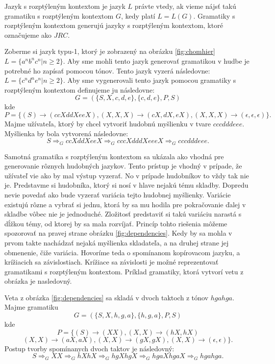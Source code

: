 Jazyk s rozptýleným kontextom je jazyk $L$ právte vtedy, ak vieme nájsť takú gramatiku s rozptýleným kontextom $G$, kedy platí $L = L(G)$. Gramatiky s rozptýleným kontextom generujú jazyky s rozptýleným kontextom, ktoré označujeme ako $JRC$.

\begin{example}
    Zoberme si jazyk typu-1, ktorý je zobrazený na obrázku \ref{fig:chomhier} \\ $L = \{a^n b^n c^n| n \geq 2\}$. Aby sme mohli tento jazyk generovať gramatikou v hudbe je potrebné ho zapísať pomocou tónov. Tento jazyk vyzerá následovne: $L = \{c^n d^n e^n| n \geq 2\}$. Aby sme vygenerovali tento jazyk pomocou gramatiky s rozptýleným kontextom definujeme ju následovne: $$ G = (\{S, X, c, d, e\}, \{c,d,e\}, P, S)$$ kde $$P = \{(S) \rightarrow (ccXddXeeX), (X,X,X) \rightarrow (cX, dX, eX), (X,X,X) \rightarrow (\epsilon, \epsilon, \epsilon)\}.$$
    Majme užívateľa, ktorý by chcel vytvoriť hudobnú myšlienku v tvare $cccdddeee$. Myšlienka by bola vytvorená následovne: $$ S \Rightarrow_G  ccXddXeeX \Rightarrow_G cccXdddXeeeX \Rightarrow_G cccdddeee.$$
\end{example}

Samotná gramatika s rozptýleným kontextom sa ukázala ako vhodná pre generovanie rôznych hudobných jazykov. Tento prístup je vhodný v prípade, že užívateľ vie ako by mal výstup vyzerať. No v prípade hudobníkov to vždy tak nie je. Predstavme si hudobníka, ktorý si nosí v hlave nejakú tému skladby. Dopredu nevie povedať ako bude vyzerať variácia tejto hudobnej myšlienky. Variácie existujú rôzne a vybrať si jednu, ktorá by sa mu hodila pre pokračovanie ďalej v skladbe vôbec nie je jednoduché. Zložitosť predstaviť si takú variáciu narastá s dĺžkou témy, od ktorej by sa mala rozvíjať. Princíp tohto riešenia môžeme spozorovať na pravej strane obrázku \ref{fig:dependencies}. Kedy by sa mohla v prvom takte nachádzať nejaká myšlienka skladateľa, a na druhej strane jej obmenenie, čiže variácia. Hovoríme teda o spomínanom kopírovacom jazyku, a krížiacich sa závislostiach. Krížiace sa závislosti je možné reprezentovať gramatikami s rozptýleným kontextom. Príklad gramatiky, ktorá vytvorí vetu z obrázka je nasledovný.

\begin{example}
Veta z obrázka \ref{fig:dependencies} sa skladá v dvoch taktoch z tónov $hgahga$. Majme gramatiku $$G = (\{S,X,h,g,a\}, \{h,g,a\}, P, S)$$ kde $$P = \{(S) \rightarrow (XX), (X,X) \rightarrow (hX,hX)$$ $$(X,X) \rightarrow (aX,aX), (X,X) \rightarrow (gX,gX), (X,X) \rightarrow (\epsilon, \epsilon)\}.$$ Postup tvorby spomínanych dvoch taktov je následovný: $$S \Rightarrow_G XX \Rightarrow_G hXhX \Rightarrow_G hgXhgX \Rightarrow_G hgaXhgaX \Rightarrow_G hgahga.$$
\end{example}

